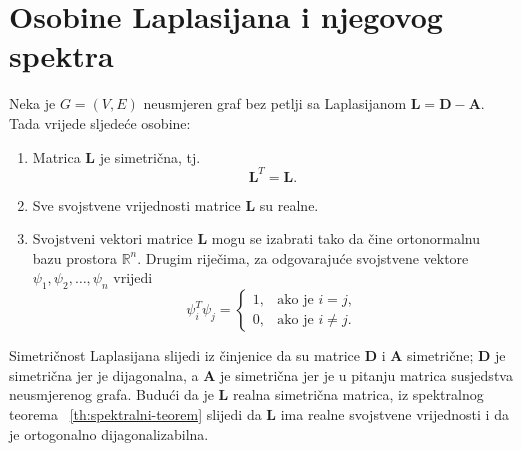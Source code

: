 \section{Osobine Laplasijana i njegovog spektra}
Neka je \(G=(V,E)\) neusmjeren graf bez petlji sa Laplasijanom \(\mathbf{L}=\mathbf{D}-\mathbf{A}\). 
Tada vrijede sljedeće osobine:
\begin{enumerate}
    \item Matrica \(\mathbf{L}\) je simetrična, tj.
    \begin{equation}
        \mathbf{L}^{T}=\mathbf{L}.
    \end{equation}
    \item Sve svojstvene vrijednosti matrice \(\mathbf{L}\) su realne.
    \item Svojstveni vektori matrice \(\mathbf{L}\) mogu se izabrati tako da čine ortonormalnu bazu prostora \(\mathbb{R}^{n}\). Drugim riječima, za odgovarajuće svojstvene vektore \(\psi_1,\psi_2,\ldots,\psi_n\) vrijedi
    \begin{equation}\label{laplasijan:L-ima-ortogonalne-eigenvektore}
        \psi_i^{T}\psi_j =
        \begin{cases}
            1, & \text{ako je } i=j,\\
            0, & \text{ako je } i \neq j.
        \end{cases}
    \end{equation}
\end{enumerate}

Simetričnost Laplasijana slijedi iz činjenice da su matrice \(\mathbf{D}\) i \(\mathbf{A}\) simetrične; \(\mathbf{D}\) je simetrična jer je dijagonalna, a \(\mathbf{A}\) je simetrična jer je u pitanju matrica susjedstva neusmjerenog grafa. Budući da je \(\mathbf{L}\) realna simetrična matrica, iz spektralnog teorema ~\ref{th:spektralni-teorem} slijedi da \(\mathbf{L}\) ima realne svojstvene vrijednosti i da je ortogonalno dijagonalizabilna.

